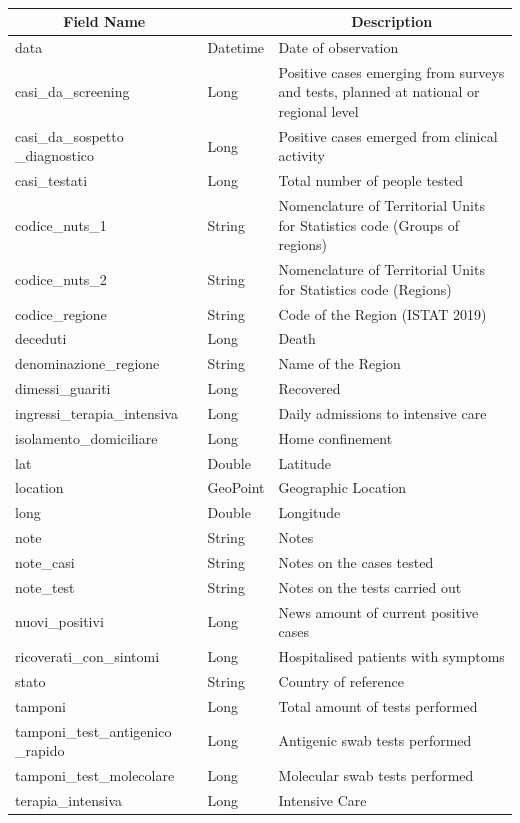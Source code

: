 \documentclass[a4paper,12pt]{article}
\begin{document}
\paragraph{}
\begin{center}
\begin{tabular}{|m{45mm}|>{\raggedright}m{16mm}|m{75mm}|}
\hline
\multicolumn{1}{|c|}{\textbf{ Field Name }}
& \multicolumn{1}{c|}{\textbf{ Data Type }} 
    	& \multicolumn{1}{c|}{\textbf{ Description }}\\
\hline
data & Datetime & Date of observation \\
\hline
casi\_da\_screening & Long & Positive cases emerging from surveys and tests, planned at national or regional level \\
\hline
casi\_da\_sospetto \_diagnostico & Long & Positive cases emerged from clinical activity \\
\hline
casi\_testati & Long & Total number of people tested \\
\hline
codice\_nuts\_1 & String & Nomenclature of Territorial Units for Statistics code (Groups of regions) \\
\hline
codice\_nuts\_2 & String & Nomenclature of Territorial Units for Statistics code (Regions) \\
\hline
codice\_regione & String & Code of the Region (ISTAT 2019) \\
\hline
deceduti & Long & Death \\
\hline
denominazione\_regione & String & Name of the Region \\
\hline
dimessi\_guariti & Long & Recovered \\
\hline
ingressi\_terapia\_intensiva & Long & Daily admissions to intensive care \\
\hline
isolamento\_domiciliare & Long & Home confinement \\
\hline
lat & Double & Latitude \\
\hline
location & GeoPoint & Geographic Location \\
\hline
long & Double & Longitude \\
\hline
note & String & Notes \\
\hline
note\_casi & String & Notes on the cases tested \\
\hline
note\_test & String & Notes on the tests carried out \\
\hline
nuovi\_positivi & Long & News amount of current positive cases \\
\hline
ricoverati\_con\_sintomi & Long & Hospitalised patients with symptoms \\
\hline
stato & String & Country of reference \\
\hline
tamponi & Long & Total amount of tests performed  \\
\hline
tamponi\_test\_antigenico \_rapido & Long & Antigenic swab tests performed \\
\hline
tamponi\_test\_molecolare & Long & Molecular swab tests performed \\
\hline
terapia\_intensiva & Long & Intensive Care \\
\hline

\end{tabular}
\end{center}
\end{document}
